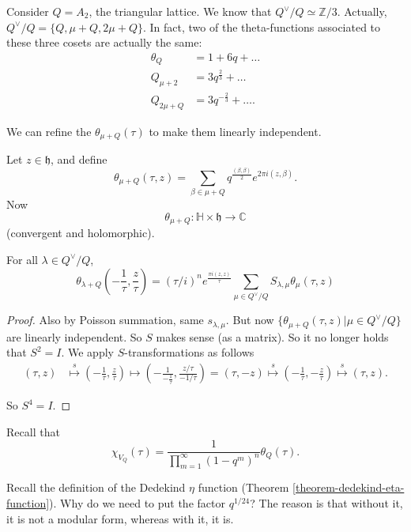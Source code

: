 \begin{example}
\label{example-a2-theta-function}
Consider $Q=A_2$, the triangular lattice.
We know that $Q^\vee/Q\simeq\mathbb{Z}/3$.
Actually, $Q^\vee/Q=\{Q,\mu+Q,2\mu+Q\}$.
In fact, two of the theta-functions associated to these
three cosets are actually the same:
\begin{align*}
\theta_Q&=1+6q+\ldots\\
Q_{\mu+2}&=3q^{\frac{2}{3}}+\ldots\\
Q_{2\mu+Q}&=3q^{-\frac{2}{3}}+\ldots.
\end{align*}

\noindent
We can refine the $\theta_{\mu+Q}(\tau)$
to make them linearly independent.

Let $z \in \mathfrak{h}$, and define
$$
\theta_{\mu+Q}(\tau,z)=\sum_{\beta \in \mu+Q}q^{\frac{(\beta,\beta)}{2}}
e^{2\pi i(z,\beta)}.
$$
Now
$$
\theta_{\mu+Q}:\mathbb{H}\times\mathfrak{h}\to\mathbb{C}
$$
(convergent and holomorphic).
\end{example}

\begin{proposition}
\label{proposition-}
For all $\lambda \in Q^\vee/Q$,
$$
\theta_{\lambda+Q}\left(-\frac{1}{\tau},\frac{z}{\tau}\right)
=(\tau/i)^ne^{\frac{\pi i(z,z)}{\tau}}
\sum_{\mu \in Q^\vee/Q}S_{\lambda,\mu}\theta_\mu(\tau,z)
$$
\end{proposition}

\begin{proof}
Also by Poisson summation, same $s_{\lambda,\mu}$.
But now $\{\theta_{\mu+Q}(\tau,z)|\mu \in Q^\vee/Q\}$ 
are linearly independent. So $S$ makes sense (as a matrix).
So it no longer holds that $S^2=I$.
We apply $S$-transformations as follows
\begin{align*}
(\tau,z)&\overset{s}{\mapsto }\left(-\frac{1}{\tau},\frac{z}{\tau}\right)
\mapsto \left(-\frac{1}{-\frac{1}{\tau}},\frac{z/\tau}{-1/\tau}\right)
=(\tau,-z)
\overset{s}{\mapsto }\left(-\frac{1}{\tau},-\frac{z}{\tau}\right)
\overset{s}{\mapsto }(\tau,z).
\end{align*}

\noindent
So $S^4=I$.
\end{proof}

\noindent
Recall that
$$
\chi_{V_Q}(\tau)=\frac{1}{\prod_{m=1}^\infty(1-q^m)^n}\theta_Q(\tau).
$$

Recall the definition of the Dedekind $\eta$ function
(Theorem \ref{theorem-dedekind-eta-function}).
Why do we need to put the factor $q^{1/24}$?
The reason is that without it, it is not a modular form,
whereas with it, it is.

